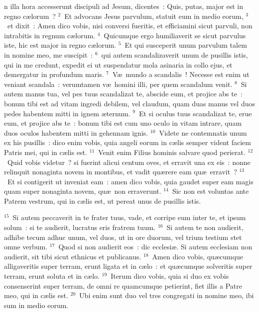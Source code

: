 \bchapter
{}n illa hora accesserunt discipuli ad Jesum, dicentes~: Quis, putas, major est in regno c\ae lorum~?
${}^{2}$~Et advocans Jesus parvulum, statuit eum in medio eorum,
${}^{3}$~et dixit~: Amen dico vobis, nisi conversi fueritis, et efficiamini sicut parvuli, non intrabitis in regnum c\ae lorum.
${}^{4}$~Quicumque ergo humiliaverit se sicut parvulus iste, hic est major in regno c\ae lorum.
${}^{5}$~Et qui susceperit unum parvulum talem in nomine meo, me suscipit~:
${}^{6}$~qui autem scandalizaverit unum de pusillis istis, qui in me credunt, expedit ei ut suspendatur mola asinaria in collo ejus, et demergatur in profundum maris.
${}^{7}$~V\ae\ mundo a scandalis~! Necesse est enim ut veniant scandala~: verumtamen v\ae\ homini illi, per quem scandalum venit.
${}^{8}$~Si autem manus tua, vel pes tuus scandalizat te, abscide eum, et projice abs te~: bonum tibi est ad vitam ingredi debilem, vel claudum, quam duas manus vel duos pedes habentem mitti in ignem \ae ternum.
${}^{9}$~Et si oculus tuus scandalizat te, erue eum, et projice abs te~: bonum tibi est cum uno oculo in vitam intrare, quam duos oculos habentem mitti in gehennam ignis.
${}^{10}$~Videte ne contemnatis unum ex his pusillis~: dico enim vobis, quia angeli eorum in c\ae lis semper vident faciem Patris mei, qui in c\ae lis est.
${}^{11}$~Venit enim Filius hominis salvare quod perierat.
${}^{12}$~Quid vobis videtur~? si fuerint alicui centum oves, et erravit una ex eis~: nonne relinquit nonaginta novem in montibus, et vadit qu\ae rere eam qu\ae\ erravit~?
${}^{13}$~Et si contigerit ut inveniat eam~: amen dico vobis, quia gaudet super eam magis quam super nonaginta novem, qu\ae\ non erraverunt.
${}^{14}$~Sic non est voluntas ante Patrem vestrum, qui in c\ae lis est, ut pereat unus de pusillis istis.


${}^{15}$~Si autem peccaverit in te frater tuus, vade, et corripe eum inter te, et ipsum solum~: si te audierit, lucratus eris fratrem tuum.
${}^{16}$~Si autem te non audierit, adhibe tecum adhuc unum, vel duos, ut in ore duorum, vel trium testium stet omne verbum.
${}^{17}$~Quod si non audierit eos~: dic ecclesi\ae . Si autem ecclesiam non audierit, sit tibi sicut ethnicus et publicanus.
${}^{18}$~Amen dico vobis, qu\ae cumque alligaveritis super terram, erunt ligata et in c\ae lo~: et qu\ae cumque solveritis super terram, erunt soluta et in c\ae lo.
${}^{19}$~Iterum dico vobis, quia si duo ex vobis consenserint super terram, de omni re quamcumque petierint, fiet illis a Patre meo, qui in c\ae lis est.
${}^{20}$~Ubi enim sunt duo vel tres congregati in nomine meo, ibi sum in medio eorum.


